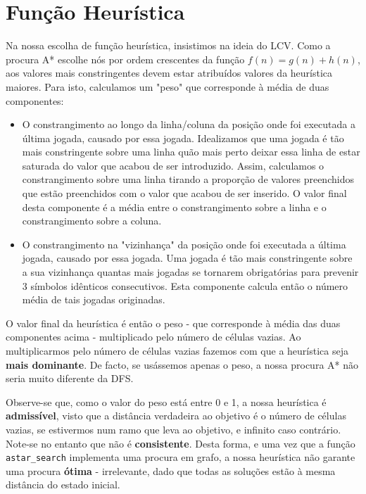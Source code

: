 \documentclass[12pt,a4paper]{article}
\begin{document}
\section*{Função Heurística}

Na nossa escolha de função heurística, insistimos na ideia do LCV. Como a procura A* escolhe nós por ordem crescentes da função $f(n) = g(n) + h(n)$, aos valores mais constringentes devem estar atribuídos valores da heurística maiores. Para isto, calculamos um "peso" que corresponde à média de duas componentes:
\begin{itemize}
  \item O constrangimento ao longo da linha/coluna da posição onde foi executada a última jogada, causado por essa jogada.
        Idealizamos que uma jogada é tão mais constringente sobre uma linha quão mais perto deixar essa linha de estar saturada do valor que acabou de ser introduzido.
        Assim, calculamos o constrangimento sobre uma linha tirando a proporção de valores preenchidos que estão preenchidos com o valor que acabou de ser inserido.
        O valor final desta componente é a média entre o constrangimento sobre a linha e o constrangimento sobre a coluna.
  \item O constrangimento na "vizinhança" da posição onde foi executada a última jogada, causado por essa jogada.
        Uma jogada é tão mais constringente sobre a sua vizinhança quantas mais jogadas se tornarem obrigatórias para prevenir 3 símbolos idênticos consecutivos.
        Esta componente calcula então o número média de tais jogadas originadas.
\end{itemize}

O valor final da heurística é então o peso - que corresponde à média das duas componentes acima - multiplicado pelo número de células vazias.
Ao multiplicarmos pelo número de células vazias fazemos com que a heurística seja \textbf{mais dominante}.
De facto, se usássemos apenas o peso, a nossa procura A* não seria muito diferente da DFS.

Observe-se que, como o valor do peso está entre 0 e 1, a nossa heurística é \textbf{admissível}, visto que a distância verdadeira ao objetivo é o número de células vazias, se estivermos num ramo que leva ao objetivo, e infinito caso contrário.
Note-se no entanto que não é \textbf{consistente}.
Desta forma, e uma vez que a função \texttt{astar\_search} implementa uma procura em grafo, a nossa heurística não garante uma procura \textbf{ótima} - irrelevante, dado que todas as soluções estão à mesma distância do estado inicial.
\end{document}
